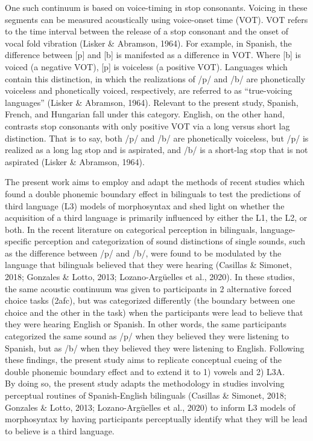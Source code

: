 \documentclass[
  man]{apa6}
\begin{document}
One such continuum is based on voice-timing in stop consonants.
Voicing in these segments can be measured acoustically using voice-onset time (VOT).
VOT refers to the time interval between the release of a stop consonant and the onset of vocal fold vibration (Lisker \& Abramson, 1964).
For example, in Spanish, the difference between {[}p{]} and {[}b{]} is manifested as a difference in VOT.
Where {[}b{]} is voiced (a negative VOT), {[}p{]} is voiceless (a positive VOT).
Languages which contain this distinction, in which the realizations of /p/ and /b/ are phonetically voiceless and phonetically voiced, respectively, are referred to as ``true-voicing languages'' (Lisker \& Abramson, 1964).
Relevant to the present study, Spanish, French, and Hungarian fall under this category.
English, on the other hand, contrasts stop consonants with only positive VOT via a long versus short lag distinction.
That is to say, both /p/ and /b/ are phonetically voiceless, but /p/ is realized as a long lag stop and is aspirated, and /b/ is a short-lag stop that is not aspirated (Lisker \& Abramson, 1964).

The present work aims to employ and adapt the methods of recent studies which found a double phonemic boundary effect in bilinguals to test the predictions of third language (L3) models of morphosyntax and shed light on whether the acquisition of a third language is primarily influenced by either the L1, the L2, or both.
In the recent literature on categorical perception in bilinguals, language-specific perception and categorization of sound distinctions of single sounds, such as the difference between /p/ and /b/, were found to be modulated by the language that bilinguals believed that they were hearing (Casillas \& Simonet, 2018; Gonzales \& Lotto, 2013; Lozano-Argüelles et al., 2020).
In these studies, the same acoustic continuum was given to participants in 2 alternative forced choice tasks (2afc), but was categorized differently (the boundary between one choice and the other in the task) when the participants were lead to believe that they were hearing English or Spanish.
In other words, the same participants categorized the same sound as /p/ when they believed they were listening to Spanish, but as /b/ when they believed they were listening to English.
Following these findings, the present study aims to replicate conceptual cueing of the double phonemic boundary effect and to extend it to 1) vowels and 2) L3A. \\
By doing so, the present study adapts the methodology in studies involving perceptual routines of Spanish-English bilinguals (Casillas \& Simonet, 2018; Gonzales \& Lotto, 2013; Lozano-Argüelles et al., 2020) to inform L3 models of morphosyntax by having participants perceptually identify what they will be lead to believe is a third language.
\end{document}
